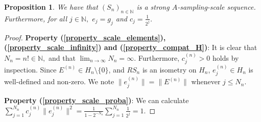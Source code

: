 \documentclass[10pt,a4paper]{amsart}
\newtheorem{prop}[thm]{Proposition}
\begin{document}



\begin{prop}
	We have that $(S_n)_{n\in\mathbb{N}}$ is a strong $A$-sampling-scale sequence. Furthermore, for all $j\in\mathbb{N},$  $e_j=g_j$ and $c_j=\frac{1}{2^j}$.
\end{prop}
\begin{proof}
	
	\textbf{Property (\ref{property_scale_elements}), (\ref{property_scale_infinity})  and (\ref{property_compat_H})}: It is clear that $N_n=n!\in\mathbb{N},$ and that $\lim_{n\rightarrow\infty} N_n=\infty.$ Furthermore, $c_j^{(n)}>0$  holds by inspection. Since $E^{(n)}\in H_n\setminus\{0\}$, and $RS_n$ is an isometry on $H_n$, $e_j^{(n)}\in H_n$ is well-defined and non-zero. We note $\|e_j^{(n)}\|=\|E^{(n)}\|$ whenever $j\leq N_n$.
	
	\textbf{Property (\ref{property_scale_proba})}: We can calculate $\sum_{j=1}^{N_n}c_j^{(n)}\|e_j^{(n)}\|^2=\frac{1}{1-2^{-N_n}}\sum_{j=1}^{N_n}\frac{1}{2^j}=1.$
	
	

\end{proof}
\end{document}
